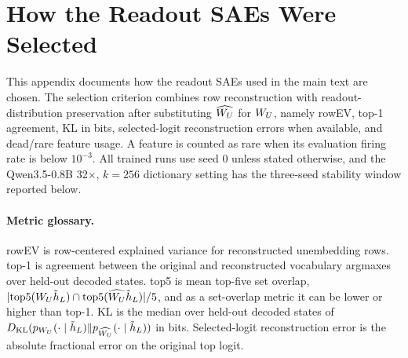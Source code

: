 
\providecommand{\ReadoutSAEFigurePath}{figures/appendix_k}
\newcommand{\ReadoutSAEGraphic}[2][]{%
  \AppendixCompactGraphic[#1]{\ReadoutSAEFigurePath/#2}%
}
\makeatletter
{}
  {
    \def\ReadoutSAE@fb@botlist{\@botlist}
    \def\ReadoutSAE@fb@topbarrier{\suppressfloats[t]}
    \newcommand{\ReadoutSAEFloatBarrier}{%
      \par\begingroup\let\@elt\relax
      \edef\@tempa{\ReadoutSAE@fb@botlist\@deferlist\@dbldeferlist}%
      \ifx\@tempa\@empty
      \else
        \ifx\@fltovf\relax
          \if@firstcolumn
            \clearpage
          \else
            \null\newpage\ReadoutSAEFloatBarrier
          \fi
        \else
          \newpage\let\@fltovf\relax\ReadoutSAEFloatBarrier
        \fi
      \fi
      \endgroup
      \ReadoutSAE@fb@topbarrier
    }
  }
  {\newcommand{\ReadoutSAEFloatBarrier}{}}
\makeatother
\setcounter{topnumber}{5}
\setcounter{bottomnumber}{3}
\setcounter{totalnumber}{8}
\renewcommand{\topfraction}{0.97}
\renewcommand{\bottomfraction}{0.90}
\renewcommand{\textfraction}{0.03}
\renewcommand{\floatpagefraction}{0.80}

\section{How the Readout SAEs Were Selected}
\label{app:readout-factorizer-sweeps}

This appendix documents how the readout SAEs used in the main text are chosen. The
selection criterion combines row reconstruction with readout-distribution
preservation after substituting $\widehat{W_U}$ for $W_U$, namely rowEV,
top-1 agreement, KL in bits, selected-logit reconstruction errors when available, and
dead/rare feature usage. A feature is counted as rare when its evaluation
firing rate is below $10^{-3}$. All trained runs use seed $0$ unless stated
otherwise, and the Qwen3.5-0.8B 32$\times$, $k=256$ dictionary setting has the
three-seed stability window reported below.

\paragraph{Metric glossary.}
rowEV is row-centered explained variance for reconstructed unembedding
rows. top-1 is agreement between the original and reconstructed vocabulary argmaxes
over held-out decoded states. top5 is mean top-five set overlap,
$|\mathrm{top5}(W_U \tilde h_L)\cap\mathrm{top5}(\widehat{W_U}\tilde h_L)|/5$, and as a set-overlap
metric it can be lower or higher than top-1. KL is the median over
held-out decoded states of
$D_{\mathrm{KL}}(p_{W_U}(\cdot\mid \tilde h_L)\|p_{\widehat{W_U}}(\cdot\mid \tilde h_L))$ in
bits. Selected-logit reconstruction error is the absolute fractional error on the
original top logit.

